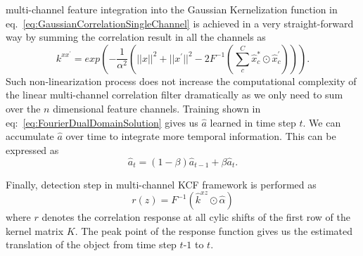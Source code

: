 \documentclass[10pt,twocolumn,letterpaper]{article}
\newcounter{ct}
\begin{document}
multi-channel feature integration into the Gaussian Kernelization
function in eq.~\ref{eq:GaussianCorrelationSingleChannel} is achieved
in a very straight-forward way by summing the correlation result in
all the channels as
\begin{equation}
k^{xx^{'}} = exp(-\dfrac{1}{\alpha^{2}}(||x||^{2}+||x^{'}||^{2}-2F^{-1}(\sum^{C}_{c}\hat{x}_{c}^{*}\odot \hat{x}_{c}^{'}))).
\label{eq:GaussianCorrelationSingleChannel}
\end{equation}
Such non-linearization process does not increase the computational
complexity of the linear multi-channel correlation filter dramatically
as we only need to sum over the $n$ dimensional feature
channels. Training shown in eq:~\ref{eq:FourierDualDomainSolution}
gives us $\hat{a}$ learned in time step $t$. We can accumulate
$\hat{a}$ over time to integrate more temporal information. This can
be expressed as
\begin{equation}
\hat{a}_{t} = (1-\beta)\hat{a}_{t-1} + \beta\hat{a}_{t}. 
\end{equation}

Finally, detection step in multi-channel KCF framework is performed as
\begin{equation}
r(z) = F^{-1}(\hat{k}^{xz} \odot \hat{\alpha})
\end{equation}
where $r$ denotes the correlation response at all cylic shifts of the
first row of the kernel matrix $K$. The peak point of the response
function gives us the estimated translation of the object from time
step $t$-$1$ to $t$.

\end{document}
